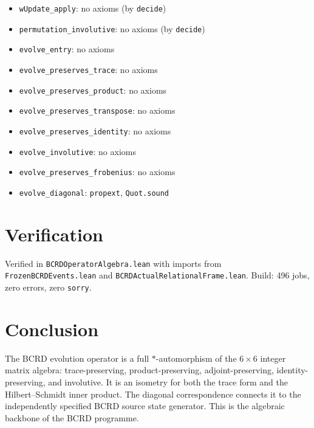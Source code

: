 \documentclass[12pt,a4paper]{article}
\begin{document}
\begin{itemize}
    \item \texttt{wUpdate\_apply}: no axioms (by \texttt{decide})
    \item \texttt{permutation\_involutive}: no axioms (by \texttt{decide})
    \item \texttt{evolve\_entry}: no axioms
    \item \texttt{evolve\_preserves\_trace}: no axioms
    \item \texttt{evolve\_preserves\_product}: no axioms
    \item \texttt{evolve\_preserves\_transpose}: no axioms
    \item \texttt{evolve\_preserves\_identity}: no axioms
    \item \texttt{evolve\_involutive}: no axioms
    \item \texttt{evolve\_preserves\_frobenius}: no axioms
    \item \texttt{evolve\_diagonal}: \texttt{propext}, \texttt{Quot.sound}
\end{itemize}

\section{Verification}

Verified in \texttt{BCRDOperatorAlgebra.lean} with imports from
\texttt{FrozenBCRDEvents.lean} and \texttt{BCRDActualRelationalFrame.lean}.
Build: 496 jobs, zero errors, zero \texttt{sorry}.

\section{Conclusion}

The BCRD evolution operator is a full $*$-automorphism of the
$6 \times 6$ integer matrix algebra: trace-preserving, product-preserving,
adjoint-preserving, identity-preserving, and involutive. It is an
isometry for both the trace form and the Hilbert--Schmidt inner product.
The diagonal correspondence connects it to the independently specified
BCRD source state generator. This is the algebraic backbone of the
BCRD programme.
\end{document}
